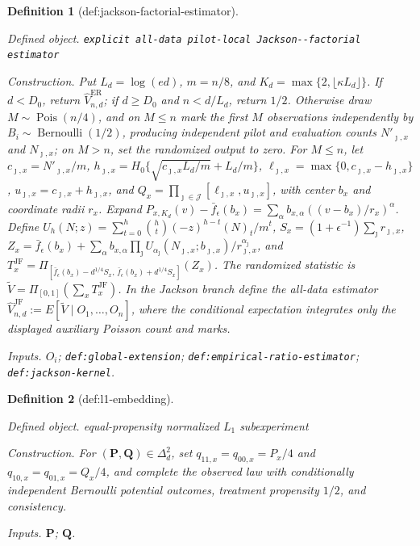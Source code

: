 \documentclass{article}
\newtheorem{definition}{Definition}
\begin{document}
\begin{definition}[def:jackson-factorial-estimator]\label{def:jackson-factorial-estimator}
\par\smallskip\noindent\emph{Defined object.} \texttt{explicit all-\allowbreak{}data pilot-\allowbreak{}local Jackson-\allowbreak{}-\allowbreak{}factorial estimator}
\par\smallskip\noindent\emph{Construction.} Put \(L_d=\log(ed)\), \(m=n/8\), and \(K_d=\max\{2,\lfloor\kappa L_d\rfloor\}\). If \(d<D_0\), return \(\widehat V_{n,d}^{\mathrm{ER}}\); if \(d\geq D_0\) and \(n<d/L_d\), return \(1/2\). Otherwise draw \(M\sim\operatorname{Pois}(n/4)\), and on \(M\leq n\) mark the first \(M\) observations independently by \(B_i\sim\operatorname{Bernoulli}(1/2)\), producing independent pilot and evaluation counts \(N'_{\jmath,x}\) and \(N_{\jmath,x}\); on \(M>n\), set the randomized output to zero. For \(M\leq n\), let \(c_{\jmath,x}=N'_{\jmath,x}/m\), \(h_{\jmath,x}=H_0\{\sqrt{c_{\jmath,x}L_d/m}+L_d/m\}\), \(\ell_{\jmath,x}=\max\{0,c_{\jmath,x}-h_{\jmath,x}\}\), \(u_{\jmath,x}=c_{\jmath,x}+h_{\jmath,x}\), and \(Q_x=\prod_{\jmath\in\mathcal J}[\ell_{\jmath,x},u_{\jmath,x}]\), with center \(b_x\) and coordinate radii \(r_x\). Expand \(P_{x,K_d}(v)-\bar f_\epsilon(b_x)=\sum_\alpha b_{x,\alpha}((v-b_x)/r_x)^\alpha\). Define \(U_h(N;z)=\sum_{t=0}^h\binom ht(-z)^{h-t}(N)_t/m^t\), \(S_x=(1+\epsilon^{-1})\sum_{\jmath}r_{\jmath,x}\), \(Z_x=\bar f_\epsilon(b_x)+\sum_\alpha b_{x,\alpha}\prod_{\jmath}U_{\alpha_{\jmath}}(N_{\jmath,x};b_{\jmath,x})/r_{\jmath,x}^{\alpha_{\jmath}}\), and \(T_x^{\mathrm{JF}}=\Pi_{[\bar f_\epsilon(b_x)-d^{1/4}S_x,\,\bar f_\epsilon(b_x)+d^{1/4}S_x]}(Z_x)\). The randomized statistic is \(\widetilde V=\Pi_{[0,1]}(\sum_xT_x^{\mathrm{JF}})\). In the Jackson branch define the all-data estimator \(\widehat V_{n,d}^{\mathrm{JF}}:=E[\widetilde V\mid O_1,\ldots,O_n]\), where the conditional expectation integrates only the displayed auxiliary Poisson count and marks.
\par\smallskip\noindent\emph{Inputs.} \(O_i\); \texttt{def:\allowbreak{}global-\allowbreak{}extension}; \texttt{def:\allowbreak{}empirical-\allowbreak{}ratio-\allowbreak{}estimator}; \texttt{def:\allowbreak{}jackson-\allowbreak{}kernel}.
\end{definition}

\begin{definition}[def:l1-embedding]\label{def:l1-embedding}
\par\smallskip\noindent\emph{Defined object.} equal-propensity normalized \(L_1\) subexperiment
\par\smallskip\noindent\emph{Construction.} For \((\mathbf P,\mathbf Q)\in\Delta_d^2\), set \(q_{11,x}=q_{00,x}=P_x/4\) and \(q_{10,x}=q_{01,x}=Q_x/4\), and complete the observed law with conditionally independent Bernoulli potential outcomes, treatment propensity \(1/2\), and consistency.
\par\smallskip\noindent\emph{Inputs.} \(\mathbf P\); \(\mathbf Q\).
\end{definition}
\end{document}
